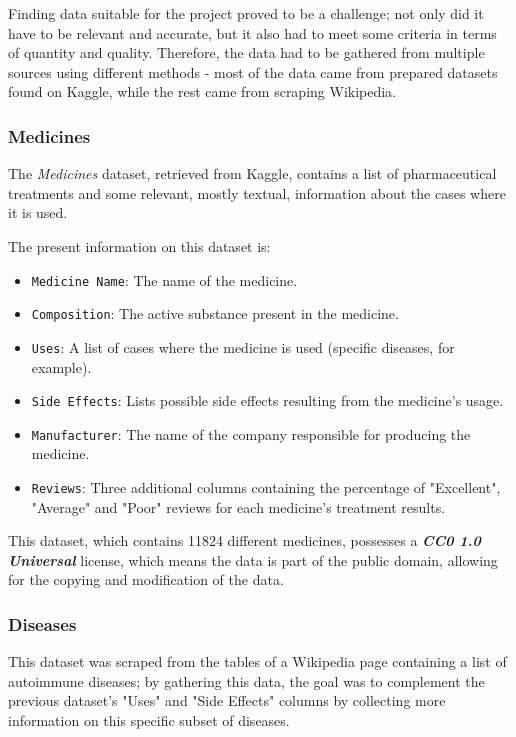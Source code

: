 \documentclass[sigconf]{acmart}
\begin{document}
Finding data suitable for the project proved to be a challenge; not only did it have to be relevant and accurate, but it also had to meet some criteria in terms of quantity and quality. Therefore, the data had to be gathered from multiple sources using different methods - most of the data came from prepared datasets found on Kaggle\cite{kaggle}, while the rest came from scraping Wikipedia\cite{wikipedia}.

\subsubsection{Medicines}

The \textit{Medicines} dataset\cite{medicines_dataset}, retrieved from Kaggle, contains a list of pharmaceutical treatments and some relevant, mostly textual, information about the cases where it is used.

The present information on this dataset is:
\begin{itemize}
	\item {\texttt{Medicine Name}}: The name of the medicine.
	\item {\texttt{Composition}}: The active substance present in the medicine.
	\item {\texttt{Uses}}: A list of cases where the medicine is used (specific diseases, for example).
	\item {\texttt{Side Effects}}: Lists possible side effects resulting from the medicine's usage.
	\item {\texttt{Manufacturer}}: The name of the company responsible for producing the medicine.
	\item {\texttt{Reviews}}: Three additional columns containing the percentage of "Excellent", "Average" and "Poor" reviews for each medicine's treatment results.
\end{itemize}

This dataset, which contains 11824 different medicines, possesses a {\textit{\textbf{CC0 1.0 Universal}}}\cite{cczero} license, which means the data is part of the public domain, allowing for the copying and modification of the data.

\subsubsection{Diseases}

This dataset was scraped from the tables of a Wikipedia page containing a list of autoimmune diseases\cite{diseases_dataset}; by gathering this data, the goal was to complement the previous dataset's "Uses" and "Side Effects" columns by collecting more information on this specific subset of diseases.
\end{document}
